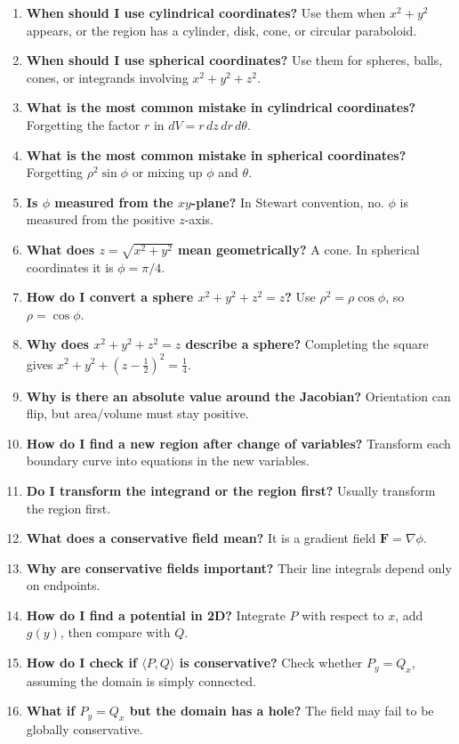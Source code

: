 \documentclass[11pt]{article}
\begin{document}
\begin{enumerate}
\item \textbf{When should I use cylindrical coordinates?} Use them when $x^2+y^2$ appears, or the region has a cylinder, disk, cone, or circular paraboloid.
\item \textbf{When should I use spherical coordinates?} Use them for spheres, balls, cones, or integrands involving $x^2+y^2+z^2$.
\item \textbf{What is the most common mistake in cylindrical coordinates?} Forgetting the factor $r$ in $dV=r\,dz\,dr\,d\theta$.
\item \textbf{What is the most common mistake in spherical coordinates?} Forgetting $\rho^2\sin\phi$ or mixing up $\phi$ and $\theta$.
\item \textbf{Is $\phi$ measured from the $xy$-plane?} In Stewart convention, no. $\phi$ is measured from the positive $z$-axis.
\item \textbf{What does $z=\sqrt{x^2+y^2}$ mean geometrically?} A cone. In spherical coordinates it is $\phi=\pi/4$.
\item \textbf{How do I convert a sphere $x^2+y^2+z^2=z$?} Use $\rho^2=\rho\cos\phi$, so $\rho=\cos\phi$.
\item \textbf{Why does $x^2+y^2+z^2=z$ describe a sphere?} Completing the square gives $x^2+y^2+(z-\frac12)^2=\frac14$.
\item \textbf{Why is there an absolute value around the Jacobian?} Orientation can flip, but area/volume must stay positive.
\item \textbf{How do I find a new region after change of variables?} Transform each boundary curve into equations in the new variables.
\item \textbf{Do I transform the integrand or the region first?} Usually transform the region first.
\item \textbf{What does a conservative field mean?} It is a gradient field $\mathbf F=\nabla\phi$.
\item \textbf{Why are conservative fields important?} Their line integrals depend only on endpoints.
\item \textbf{How do I find a potential in 2D?} Integrate $P$ with respect to $x$, add $g(y)$, then compare with $Q$.
\item \textbf{How do I check if $\langle P,Q\rangle$ is conservative?} Check whether $P_y=Q_x$, assuming the domain is simply connected.
\item \textbf{What if $P_y=Q_x$ but the domain has a hole?} The field may fail to be globally conservative.

\end{enumerate}
\end{document}
